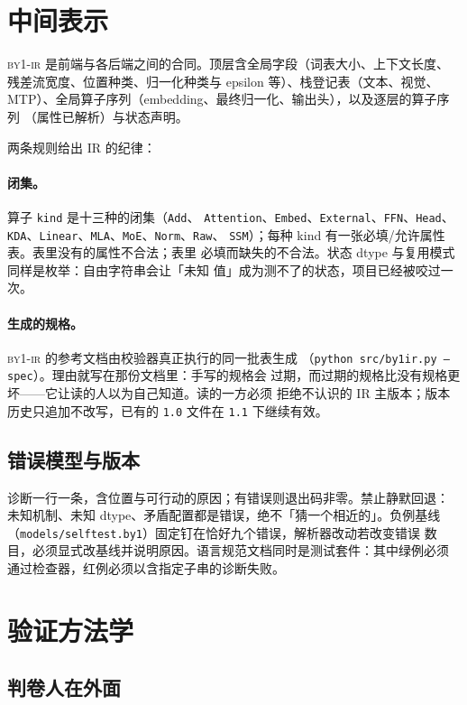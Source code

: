 \documentclass[11pt,a4paper]{ctexart}
\newcommand{\code}[1]{\texttt{#1}}
\newcommand{\ir}{\textsc{by1-ir}}
\begin{document}
\section{中间表示}
\label{sec:ir}

\ir{} 是前端与各后端之间的合同。顶层含全局字段（词表大小、上下文长度、
残差流宽度、位置种类、归一化种类与 epsilon 等）、栈登记表（文本、视觉、
MTP）、全局算子序列（embedding、最终归一化、输出头），以及逐层的算子序列
（属性已解析）与状态声明。

两条规则给出 IR 的纪律：

\paragraph{闭集。}算子 \code{kind} 是十三种的闭集（\code{Add}、
\code{Attention}、\code{Embed}、\code{External}、\code{FFN}、\code{Head}、
\code{KDA}、\code{Linear}、\code{MLA}、\code{MoE}、\code{Norm}、\code{Raw}、
\code{SSM}）；每种 kind 有一张必填/允许属性表。表里没有的属性不合法；表里
必填而缺失的不合法。状态 dtype 与复用模式同样是枚举：自由字符串会让「未知
值」成为测不了的状态，项目已经被咬过一次。

\paragraph{生成的规格。}\ir{} 的参考文档由校验器真正执行的同一批表生成
（\code{python src/by1ir.py --spec}）。理由就写在那份文档里：手写的规格会
过期，而过期的规格比没有规格更坏——它让读的人以为自己知道。读的一方必须
拒绝不认识的 IR 主版本；版本历史只追加不改写，已有的 \code{1.0} 文件在
\code{1.1} 下继续有效。

\subsection{错误模型与版本}

诊断一行一条，含位置与可行动的原因；有错误则退出码非零。禁止静默回退：
未知机制、未知 dtype、矛盾配置都是错误，绝不「猜一个相近的」。负例基线
（\code{models/selftest.by1}）固定钉在恰好九个错误，解析器改动若改变错误
数目，必须显式改基线并说明原因。语言规范文档同时是测试套件：其中绿例必须
通过检查器，红例必须以含指定子串的诊断失败。

\section{验证方法学}
\label{sec:verify}

\subsection{判卷人在外面}
\end{document}
